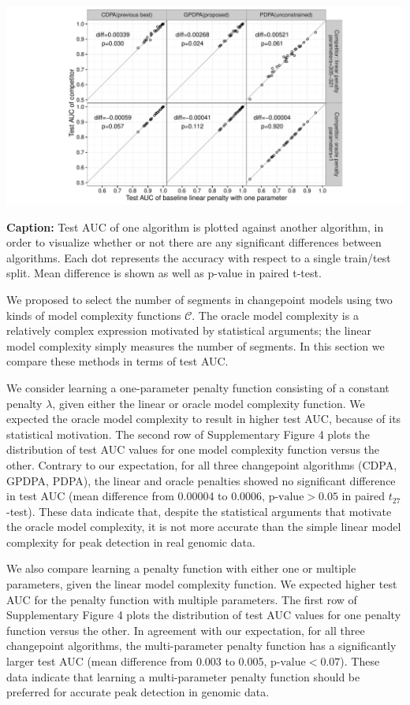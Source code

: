\documentclass{article}
\begin{document}
\includegraphics[width=\textwidth]{figure-all-cv-learned-oracle-compare}

\textbf{Caption:} Test AUC of one algorithm is plotted against another
algorithm, in order to visualize whether or not there are any
significant differences between algorithms. Each dot represents the
accuracy with respect to a single train/test split. Mean difference is
shown as well as p-value in paired t-test.

We proposed to select the number of
segments in changepoint models using two kinds of model complexity
functions $\mathcal C$. The oracle model complexity
is a relatively complex expression
 motivated by statistical arguments; the linear model complexity
simply measures the number of segments. In this section we compare
these methods in terms of test AUC.

We consider learning a one-parameter penalty function consisting of a
constant penalty $\lambda$, given either the linear or oracle model
complexity function. We expected the oracle model complexity to result
in higher test AUC, because of its statistical motivation. The second
row of Supplementary Figure 4 plots the distribution of test AUC
values for one model complexity function versus the other. Contrary to
our expectation, for all three changepoint algorithms (CDPA, GPDPA,
PDPA), the linear and oracle penalties showed no significant
difference in test AUC (mean difference from 0.00004 to 0.0006,
$\text{p-value}>0.05$ in paired $t_{27}$-test). These data indicate
that, despite the statistical arguments that motivate the oracle model
complexity, it is not more accurate than the simple linear model
complexity for peak detection in real genomic data.

We also compare learning a penalty function with either one or
multiple parameters, given the linear model complexity function. We
expected higher test AUC for the penalty function with multiple
parameters. The first row of Supplementary Figure 4 plots the
distribution of test AUC values for one penalty function versus the
other. In agreement with our expectation, for all three changepoint
algorithms, the multi-parameter penalty function has a significantly
larger test AUC (mean difference from 0.003 to 0.005, $\text{p-value}<0.07$). These
data indicate that learning a multi-parameter penalty function should
be preferred for accurate peak detection in genomic data.
\end{document}
